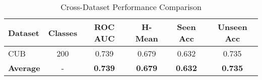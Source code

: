 
\begin{table}[htbp]
\centering
\caption{Cross-Dataset Performance Comparison}
\label{tab:cross_dataset}
\begin{tabular}{|l|c|c|c|c|c|}
\hline
\textbf{Dataset} & \textbf{Classes} & \textbf{ROC AUC} & \textbf{H-Mean} & \textbf{Seen Acc} & \textbf{Unseen Acc} \\
\hline
CUB & 200 & 0.739 & 0.679 & 0.632 & 0.735 \\
\hline
\textbf{Average} & - & \textbf{0.739} & \textbf{0.679} & \textbf{0.632} & \textbf{0.735} \\
\hline
\end{tabular}
\end{table}
